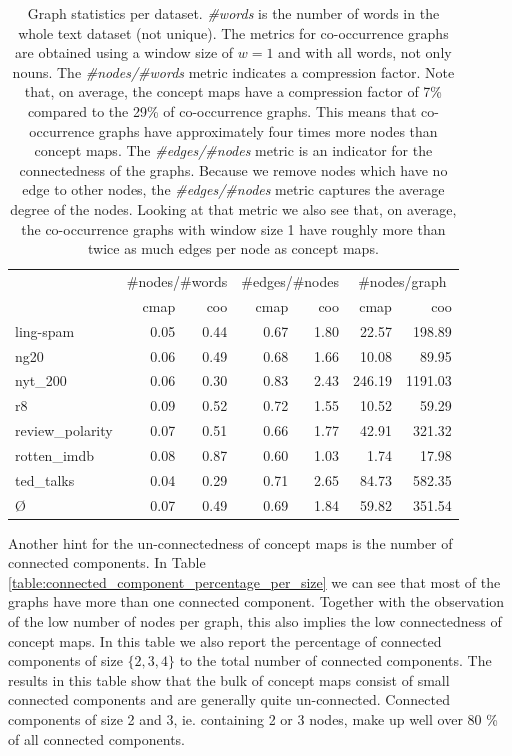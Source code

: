 \begin{table}[htb!]
	\centering
	\begin{tabular}{lrrrrrr}
\toprule
		{} &  \multicolumn{2}{c}{\#nodes/\#words} &  \multicolumn{2}{c}{\#edges/\#nodes} & \multicolumn{2}{c}{\#nodes/graph} \\
		{} & cmap &  coo & cmap & coo & cmap & coo\\
		\midrule
ling-spam       & 0.05 & 0.44 & 0.67 & 1.80 & 22.57 & 198.89 \\
ng20            & 0.06 & 0.49 & 0.68 & 1.66 & 10.08 & 89.95 \\
nyt\_200         & 0.06 & 0.30 & 0.83 & 2.43 & 246.19 & 1191.03 \\
r8              & 0.09 & 0.52 & 0.72 & 1.55 & 10.52 & 59.29 \\
review\_polarity & 0.07 & 0.51 & 0.66 & 1.77 & 42.91 & 321.32 \\
rotten\_imdb     & 0.08 & 0.87 & 0.60 & 1.03 & 1.74 & 17.98 \\
ted\_talks       & 0.04 & 0.29 & 0.71 & 2.65 & 84.73 & 582.35 \\
			\midrule
			\O{}            & 0.07 & 0.49 & 0.69 & 1.84 & 59.82 & 351.54 \\
			\bottomrule
	\end{tabular}	
	\caption[Statistics: Graphs]{Graph statistics per dataset. \textit{\#words} is the number of words in the whole text dataset (not unique). The metrics for co-occurrence graphs are obtained using a window size of $w=1$ and with all words, not only nouns. The \textit{\#nodes/\#words} metric indicates a compression factor. Note that, on average, the concept maps have a compression factor of 7\% compared to the 29\% of co-occurrence graphs. This means that co-occurrence graphs have approximately four times more nodes than concept maps. The \textit{\#edges/\#nodes} metric is an indicator for the connectedness of the graphs. Because we remove nodes which have no edge to other nodes, the \textit{\#edges/\#nodes} metric captures the average degree of the nodes. Looking at that metric we also see that, on average, the co-occurrence graphs with window size 1 have roughly more than twice as much edges per node as concept maps.}\label{table:graph_statistics}
\end{table}

Another hint for the un-connectedness of concept maps is the number of connected components.
In Table \ref{table:connected_component_percentage_per_size} we can see that most of the graphs have more than one connected component. Together with the observation of the low number of nodes per graph, this also implies the low connectedness of concept maps.
In this table we also report the percentage of connected components of size $\{2,3,4\}$ to the total number of connected components.
The results in this table show that the bulk of concept maps consist of small connected components and are generally quite un-connected. Connected components of size 2 and 3, ie. containing 2 or 3 nodes, make up well over 80 \% of all connected components.

